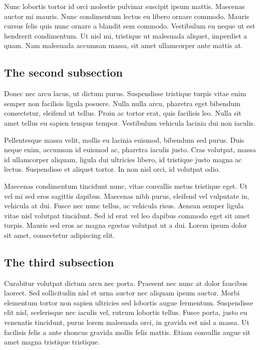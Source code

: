 Nunc lobortis tortor id orci molestie pulvinar suscipit ipsum mattis. Maecenas auctor mi mauris. Nunc condimentum lectus eu libero ornare commodo. Mauris cursus felis quis nunc ornare a blandit sem commodo. Vestibulum eu neque ut est hendrerit condimentum. Ut nisl mi, tristique ut malesuada aliquet, imperdiet a quam. Nam malesuada accumsan massa, sit amet ullamcorper ante mattis at.

\subsection{The second subsection}
\label{ch2:first:b}
Donec nec arcu lacus, ut dictum purus. Suspendisse tristique turpis vitae enim semper non facilisis ligula posuere. Nulla nulla arcu, pharetra eget bibendum consectetur, eleifend ut tellus. Proin ac tortor erat, quis facilisis leo. Nulla sit amet tellus eu sapien tempus tempor. Vestibulum vehicula lacinia dui non iaculis. 

Pellentesque massa velit, mollis eu lacinia euismod, bibendum sed purus. Duis neque enim, accumsan id euismod ac, pharetra iaculis justo. Cras volutpat, massa id ullamcorper aliquam, ligula dui ultricies libero, id tristique justo magna ac lectus. Suspendisse et aliquet tortor. In non nisl orci, id volutpat odio. 

Maecenas condimentum tincidunt nunc, vitae convallis metus tristique eget. Ut vel mi sed eros sagittis dapibus. Maecenas nibh purus, eleifend vel vulputate in, vehicula at dui. Fusce nec nunc tellus, ac vehicula risus. Aenean semper ligula vitae nisl volutpat tincidunt. Sed id erat vel leo dapibus commodo eget sit amet turpis. Mauris sed eros ac magna egestas volutpat ut a dui. Lorem ipsum dolor sit amet, consectetur adipiscing elit.

\subsection{The third subsection}
\label{ch2:first:c}
Curabitur volutpat dictum arcu nec porta. Praesent nec nunc at dolor faucibus laoreet. Sed sollicitudin nisl et urna auctor nec aliquam ipsum auctor. Morbi elementum tortor non sapien ultricies sed lobortis augue fermentum. Suspendisse elit nisl, scelerisque nec iaculis vel, rutrum lobortis tellus. Fusce porta, justo eu venenatis tincidunt, purus lorem malesuada orci, in gravida est nisl a massa. Ut facilisis felis a ante rhoncus gravida mollis felis mattis. Etiam convallis augue sit amet magna tristique tristique. 

